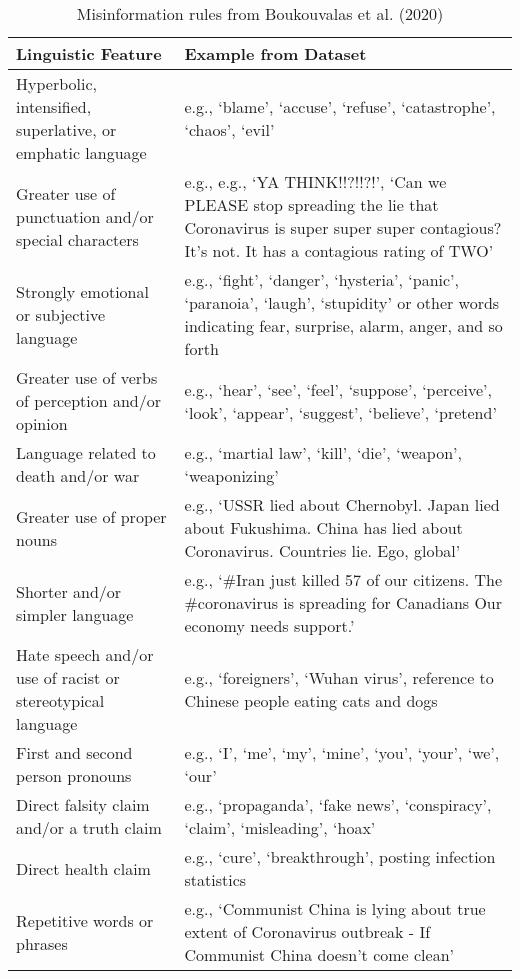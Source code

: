 \documentclass{article}
\begin{document}
\label{sec:appendix}

\begin{table}[htp]
 \caption{Misinformation rules from Boukouvalas et al. (2020)}
  \centering
  \begin{tabular}{p{6cm}|p{9cm}}
    \hline
    \textbf{Linguistic Feature} & \textbf{Example from Dataset} \\ [0.5 ex]
    \hline\hline
    Hyperbolic, intensified, superlative, or emphatic language & e.g., ‘blame’, ‘accuse’, ‘refuse’, ‘catastrophe’, ‘chaos’, ‘evil’ \\
    \hline
    Greater use of punctuation and/or special characters & e.g., e.g., ‘YA THINK!!?!!?!’, ‘Can we PLEASE stop spreading the lie that Coronavirus is super super super contagious? It’s not. It has a contagious rating of TWO’ \\
    \hline
    Strongly emotional or subjective language & e.g., ‘fight’, ‘danger’, ‘hysteria’, ‘panic’, ‘paranoia’, ‘laugh’, ‘stupidity’ or other words indicating fear, surprise, alarm, anger, and so forth \\
    \hline
    Greater use of verbs of perception and/or opinion & e.g., ‘hear’, ‘see’, ‘feel’, ‘suppose’, ‘perceive’, ‘look’, ‘appear’, ‘suggest’, ‘believe’, ‘pretend’ \\
    \hline
    Language related to death and/or war & e.g., ‘martial law’, ‘kill’, ‘die’, ‘weapon’, ‘weaponizing’ \\
    \hline
    Greater use of proper nouns & e.g., ‘USSR lied about Chernobyl. Japan lied about Fukushima. China has lied about Coronavirus. Countries lie. Ego, global’ \\
    \hline
    Shorter and/or simpler language & e.g., ‘\#Iran just killed 57 of our citizens. The \#coronavirus is spreading for Canadians Our economy needs support.’ \\
    \hline
    Hate speech and/or use of racist or stereotypical language & e.g., ‘foreigners’, ‘Wuhan virus’, reference to Chinese people eating cats and dogs \\
    \hline
    First and second person pronouns & e.g., ‘I’, ‘me’, ‘my’, ‘mine’, ‘you’, ‘your’, ‘we’, ‘our’ \\
    \hline
    Direct falsity claim and/or a truth claim & e.g., ‘propaganda’, ‘fake news’, ‘conspiracy’, ‘claim’, ‘misleading’, ‘hoax’ \\
    \hline
    Direct health claim & e.g., ‘cure’, ‘breakthrough’, posting infection statistics \\
    \hline
    Repetitive words or phrases & e.g., ‘Communist China is lying about true extent of Coronavirus outbreak - If Communist China doesn’t come clean’ \\

\end{tabular}
\end{table}
\end{document}
